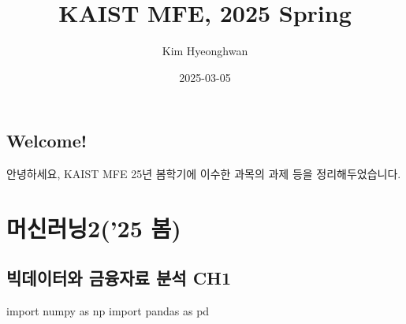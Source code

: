 \documentclass[
  a4paper,
  DIV=11,
  numbers=noendperiod]{scrreprt}
\title{KAIST MFE, 2025 Spring}
\author{Kim Hyeonghwan}
\date{2025-03-05}
\newenvironment{Shaded}{\begin{snugshade}}{\end{snugshade}}
\newcommand{\ImportTok}[1]{\textcolor[rgb]{0.00,0.46,0.62}{#1}}
\newcommand{\NormalTok}[1]{\textcolor[rgb]{0.00,0.23,0.31}{#1}}
\renewcommand*\contentsname{Table of contents}
\newcommand\contentsname{Table of contents}
\begin{document}
\maketitle

\renewcommand*\contentsname{Table of contents}
{
\hypersetup{linkcolor=}
\setcounter{tocdepth}{2}
\tableofcontents
}

\chapter*{Welcome!}\label{welcome}


안녕하세요, KAIST MFE 25년 봄학기에 이수한 과목의 과제 등을
정리해두었습니다.

\part{머신러닝2('25 봄)}

\chapter{빅데이터와 금융자료 분석
CH1}\label{uxbe45uxb370uxc774uxd130uxc640-uxae08uxc735uxc790uxb8cc-uxbd84uxc11d-ch1}

\begin{Shaded}
\begin{Highlighting}[]
\ImportTok{import}\NormalTok{ numpy }\ImportTok{as}\NormalTok{ np}
\ImportTok{import}\NormalTok{ pandas }\ImportTok{as}\NormalTok{ pd}
\end{Highlighting}
\end{Shaded}
\end{document}
